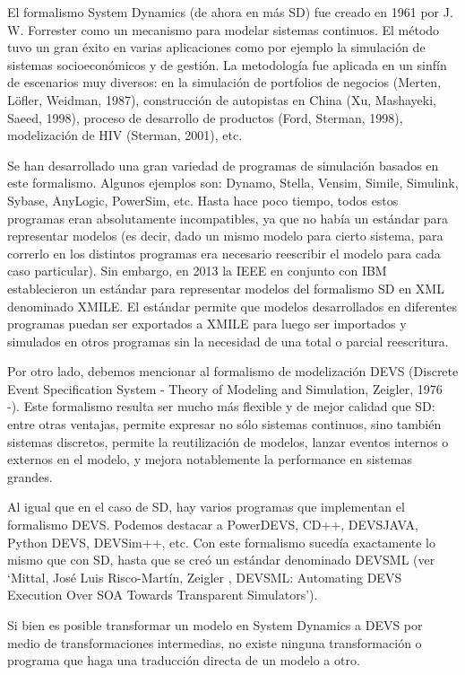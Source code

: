 
El formalismo System Dynamics (de ahora en más SD) fue creado en 1961 por J. W.
Forrester como un mecanismo para modelar sistemas continuos. El método tuvo un
gran éxito en varias aplicaciones como por ejemplo la simulación de sistemas
socioeconómicos y de gestión. La metodología fue aplicada en un sinfín de
escenarios muy diversos: en la simulación de portfolios de negocios (Merten,
Löfler, Weidman, 1987), construcción de autopistas en China (Xu, Mashayeki,
Saeed, 1998), proceso de desarrollo de productos (Ford, Sterman, 1998),
modelización de HIV (Sterman, 2001), etc.


Se han desarrollado una gran variedad de programas de simulación basados en este formalismo. Algunos ejemplos son: Dynamo, Stella, Vensim, Simile, Simulink, Sybase, AnyLogic, PowerSim, etc. Hasta hace poco tiempo, todos estos programas eran absolutamente incompatibles, ya que no había un estándar para representar modelos (es decir, dado un mismo modelo para cierto sistema, para correrlo en los distintos programas era necesario reescribir el modelo para cada caso particular). Sin embargo, en 2013 la IEEE en conjunto con IBM establecieron un estándar para representar modelos del formalismo SD en XML denominado XMILE. El estándar permite que modelos desarrollados en diferentes programas puedan ser exportados a XMILE para luego ser importados y simulados en otros programas sin la necesidad de una total o parcial reescritura.

Por otro lado, debemos mencionar al formalismo de modelización DEVS (Discrete Event Specification System - Theory of Modeling and Simulation, Zeigler, 1976 -). Este formalismo resulta ser mucho más flexible y de mejor calidad que SD: entre otras ventajas, permite expresar no sólo sistemas continuos, sino también sistemas discretos, permite la reutilización de modelos, lanzar eventos internos o externos en el modelo, y mejora notablemente la performance en sistemas grandes.

Al igual que en el caso de SD, hay varios programas que implementan el formalismo DEVS. Podemos destacar a PowerDEVS, CD++, DEVSJAVA, Python DEVS,  DEVSim++, etc. Con este formalismo sucedía exactamente lo mismo que con SD, hasta que se creó un estándar denominado DEVSML (ver ‘Mittal, José Luis Risco-Martín, Zeigler , DEVSML: Automating DEVS Execution Over SOA Towards Transparent Simulators’).

Si bien es posible transformar un modelo en System Dynamics a DEVS por medio de transformaciones intermedias, no existe ninguna transformación o programa que haga una traducción directa de un modelo a otro. 

